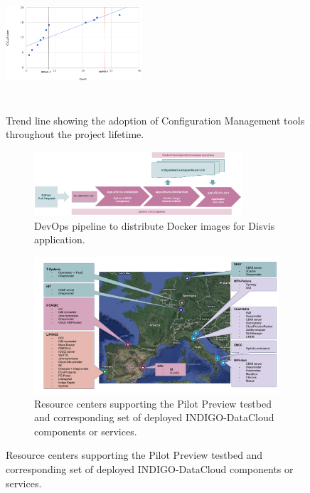 \documentclass[journal]{IEEEtran}
\begin{document}
\begin{figure}[ht]
\centering
\includegraphics[width=0.45\textwidth, height=50mm]{images/confman.png}
\caption{Trend line showing the adoption of Configuration Management tools throughout the project lifetime.}
\label{fig:fig_confman}
\end{figure}

\begin{figure}	
	\centering
	\begin{subfigure}
		\centering
\includegraphics[width=0.85\textwidth]{images/disvis-flow.png}
\caption{DevOps pipeline to distribute Docker images for Disvis application.}
\label{fig:fig_disvis}		
	\end{subfigure}
	\quad
	\begin{subfigure}
		\centering
\includegraphics[width=\textwidth]{images/pilotpreview.png}
\caption{Resource centers supporting the Pilot Preview testbed and corresponding
set of deployed INDIGO-DataCloud components or services.}
\label{fig:fig_pilotpreview}
	\end{subfigure}
\end{figure}
\end{document}
